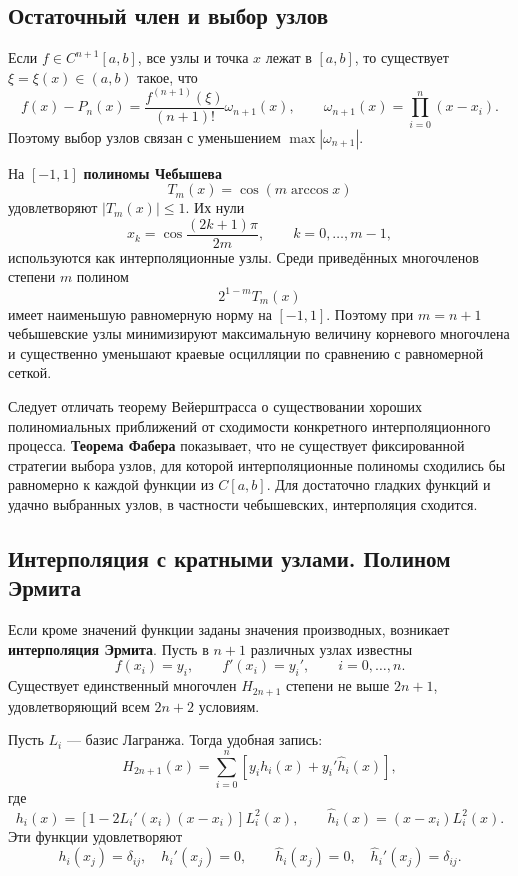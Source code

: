 \subsection{Остаточный член и выбор узлов}

Если $f\in C^{n+1}[a,b]$, все узлы и точка $x$ лежат в $[a,b]$, то существует $\xi=\xi(x)\in(a,b)$ такое, что
\[
\boxed{
f(x)-P_n(x)
=
\frac{f^{(n+1)}(\xi)}{(n+1)!}
\omega_{n+1}(x),
\qquad
\omega_{n+1}(x)=\prod_{i=0}^{n}(x-x_i).
}
\]
Поэтому выбор узлов связан с уменьшением $\max|\omega_{n+1}|$.

На $[-1,1]$ \textbf{полиномы Чебышева}
\[
T_m(x)=\cos(m\arccos x)
\]
удовлетворяют $|T_m(x)|\le1$. Их нули
\[
x_k=\cos\frac{(2k+1)\pi}{2m},
\qquad k=0,\ldots,m-1,
\]
используются как интерполяционные узлы. Среди приведённых многочленов степени $m$ полином
\[
2^{1-m}T_m(x)
\]
имеет наименьшую равномерную норму на $[-1,1]$. Поэтому при $m=n+1$ чебышевские узлы минимизируют максимальную величину корневого многочлена и существенно уменьшают краевые осцилляции по сравнению с равномерной сеткой.

Следует отличать теорему Вейерштрасса о существовании хороших полиномиальных приближений от сходимости конкретного интерполяционного процесса. \textbf{Теорема Фабера} показывает, что не существует фиксированной стратегии выбора узлов, для которой интерполяционные полиномы сходились бы равномерно к каждой функции из $C[a,b]$. Для достаточно гладких функций и удачно выбранных узлов, в частности чебышевских, интерполяция сходится.

\subsection{Интерполяция с кратными узлами. Полином Эрмита}

Если кроме значений функции заданы значения производных, возникает \textbf{интерполяция Эрмита}. Пусть в $n+1$ различных узлах известны
\[
f(x_i)=y_i,
\qquad
f'(x_i)=y_i',
\qquad i=0,\ldots,n.
\]
Существует единственный многочлен $H_{2n+1}$ степени не выше $2n+1$, удовлетворяющий всем $2n+2$ условиям.

Пусть $L_i$ --- базис Лагранжа. Тогда удобная запись:
\[
H_{2n+1}(x)
=
\sum_{i=0}^{n}
\left[y_i h_i(x)+y_i'\widehat h_i(x)\right],
\]
где
\[
h_i(x)=
\left[1-2L_i'(x_i)(x-x_i)\right]L_i^2(x),
\qquad
\widehat h_i(x)=(x-x_i)L_i^2(x).
\]
Эти функции удовлетворяют
\[
h_i(x_j)=\delta_{ij},\quad h_i'(x_j)=0,
\qquad
\widehat h_i(x_j)=0,\quad \widehat h_i'(x_j)=\delta_{ij}.
\]

